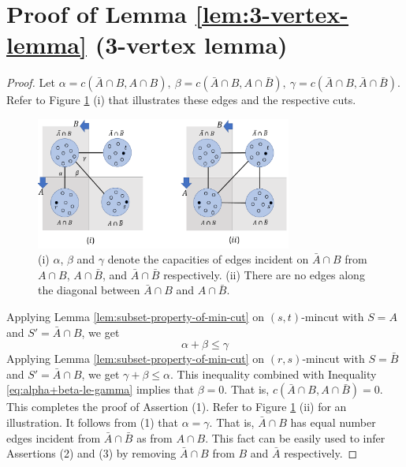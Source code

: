 \section{Proof of Lemma \ref{lem:3-vertex-lemma} (3-vertex lemma)} \label{appendix:3-vertex-lemma}

\begin{proof}
Let $\alpha = c(\bar{A}\cap B, A\cap {B}),
~\beta = c(\bar{A} \cap B, A\cap \bar{B}),~\gamma=c(\bar{A} \cap B, \bar{A}\cap \bar{B})$.
Refer to Figure \ref{fig:non-S-crossing} (i) that illustrates these edges and the respective cuts.
\begin{figure}[H]
\centering
\includegraphics[width=0.75\textwidth]{src/images/S-crossing-and-non-crossing_new.pdf}
    \caption{(i) $\alpha$, $\beta$ and $\gamma$ denote the capacities of edges incident on $\bar{A}\cap B$ from $A\cap B$, $A\cap \bar{B}$, and $\bar{A} \cap \bar{B}$ respectively. (ii) There are no edges along the diagonal between $\bar{A}\cap {B}$ and $A\cap \bar{B}$.}
\label{fig:non-S-crossing}
\end{figure}

Applying Lemma \ref{lem:subset-property-of-min-cut}
on $(s,t)$-mincut with $S=A$ and $S'= \bar{A}\cap B$, we get
\begin{equation}
    \alpha + \beta \le \gamma 
\label{eq:alpha+beta-le-gamma}
\end{equation}
Applying Lemma \ref{lem:subset-property-of-min-cut} on $(r,s)$-mincut with $S=\bar B$ and  $S'= \bar{A} \cap B$, we get $\gamma + \beta \le \alpha$. This inequality combined with Inequality \ref{eq:alpha+beta-le-gamma} implies that $\beta=0$. That is, $c(\bar{A}\cap B, A\cap \bar{B})=0$. This completes the proof of Assertion (1). Refer to Figure \ref{fig:non-S-crossing} (ii) for an illustration. 
It follows from (1) that $\alpha=\gamma$.
That is, $\bar{A} \cap B$ has equal number edges incident from $\bar{A}\cap \bar{B}$ as from $A\cap B$.  This fact can be easily used to infer Assertions (2) and (3) by 
removing $\bar{A}\cap B$ from $B$ and
$\bar{A}$ respectively.
\end{proof}


